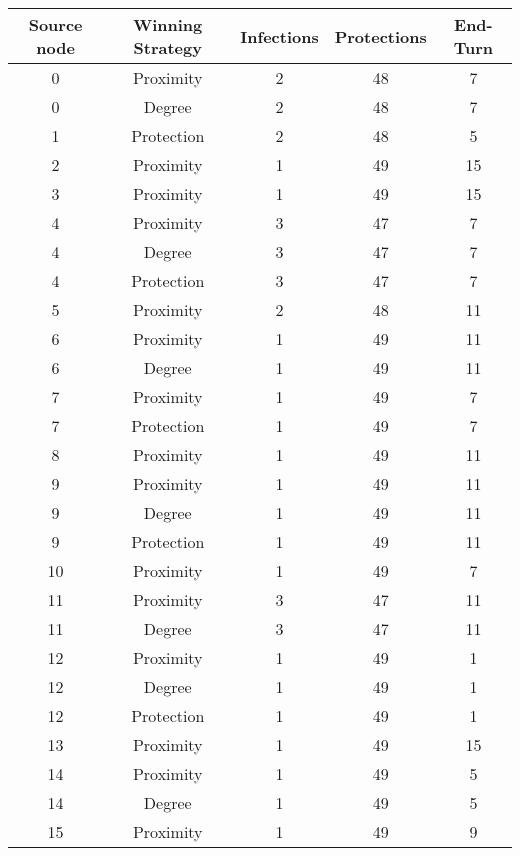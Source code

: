 \documentclass[results.tex]{subfiles}
\begin{document}
\begin{center}
  \begin{tabular}{| c || c | c | c | c |}
    \hline
    {\bfseries Source node} & {\bfseries Winning Strategy} & {\bfseries Infections} & {\bfseries Protections} & {\bfseries End-Turn} \\  %
    \hline\hline
    0 & Proximity & 2 & 48 & 7 \\ 
    \hline
    0 & Degree & 2 & 48 & 7 \\ 
    \hline
    1 & Protection & 2 & 48 & 5 \\ 
    \hline
    2 & Proximity & 1 & 49 & 15 \\ 
    \hline
    3 & Proximity & 1 & 49 & 15 \\ 
    \hline
    4 & Proximity & 3 & 47 & 7 \\ 
    \hline
    4 & Degree & 3 & 47 & 7 \\ 
    \hline
    4 & Protection & 3 & 47 & 7 \\ 
    \hline
    5 & Proximity & 2 & 48 & 11 \\ 
    \hline
    6 & Proximity & 1 & 49 & 11 \\ 
    \hline
    6 & Degree & 1 & 49 & 11 \\ 
    \hline
    7 & Proximity & 1 & 49 & 7 \\ 
    \hline
    7 & Protection & 1 & 49 & 7 \\ 
    \hline
    8 & Proximity & 1 & 49 & 11 \\ 
    \hline
    9 & Proximity & 1 & 49 & 11 \\ 
    \hline
    9 & Degree & 1 & 49 & 11 \\ 
    \hline
    9 & Protection & 1 & 49 & 11 \\ 
    \hline
    10 & Proximity & 1 & 49 & 7 \\ 
    \hline
    11 & Proximity & 3 & 47 & 11 \\ 
    \hline
    11 & Degree & 3 & 47 & 11 \\ 
    \hline
    12 & Proximity & 1 & 49 & 1 \\ 
    \hline
    12 & Degree & 1 & 49 & 1 \\ 
    \hline
    12 & Protection & 1 & 49 & 1 \\ 
    \hline
    13 & Proximity & 1 & 49 & 15 \\ 
    \hline
    14 & Proximity & 1 & 49 & 5 \\ 
    \hline
    14 & Degree & 1 & 49 & 5 \\ 
    \hline
    15 & Proximity & 1 & 49 & 9 \\ 

\end{tabular}
\end{center}
\end{document}
